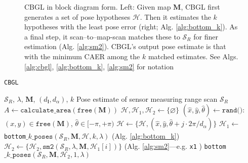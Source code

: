 \begin{figure}[H]%
  \subfloat{\label{fig:cbgl}     }
  \subfloat{\label{fig:bottom_k} }
  \caption{\small CBGL in block diagram form. Left: Given map $\bm{M}$, CBGL
           first generates a set of pose hypotheses $\mathcal{H}$. Then it
           estimates the $k$ hypotheses with the least pose error (right; Alg.
           \ref{alg:bottom_k}).
           As a final step, it scan--to--map-scan
           matches these to $\mathcal{S}_R$ for finer estimation
           (Alg. \ref{alg:sm2}).
           CBGL's output pose estimate is that with
           the minimum CAER among the $k$ matched estimates. See Algs.
           \ref{alg:cbgl}, \ref{alg:bottom_k}, \ref{alg:sm2} for notation
           }
  \label{fig:block_system}
\end{figure}


\begin{algorithm}[H]
  \caption{\texttt{CBGL}}
  \begin{spacing}{1.0}
  \begin{algorithmic}[1]
    \REQUIRE $\mathcal{S}_R$, $\lambda$, $\bm{M}$, $(d_{\bm{l}}, d_\alpha)$, $k$
    \ENSURE Pose estimate of sensor measuring range scan $\mathcal{S}_R$ %
    \STATE $A \leftarrow \texttt{calculate\_area}(\texttt{free}(\bm{M}))$
    \STATE $\mathcal{H}, \mathcal{H}_1, \mathcal{H}_2 \leftarrow \{\varnothing\}$
      \STATE \small $(\hat{x},\hat{y},\hat{\theta}) \leftarrow \texttt{rand()}$: $(x,y) \in \texttt{free}(\bm{M})$, $\hat{\theta} \in [-\pi,+\pi)$
        \STATE $\mathcal{H} \leftarrow \{\mathcal{H}, (\hat{x}, \hat{y}, \hat{\theta} + j \cdot 2\pi / d_{\alpha})\}$     \label{alg:cbgl:h}
      \ENDFOR
    \ENDFOR
    \STATE $\mathcal{H}_1 \leftarrow$ \texttt{bottom}$\_k\_\texttt{poses}(\mathcal{S}_R, \bm{M}, \mathcal{H}, k, \lambda)$ \hfill {\small (Alg. \ref{alg:bottom_k}}) \label{alg:cbgl:h1}
      \STATE \footnotesize $\mathcal{H}_2 \leftarrow \{\mathcal{H}_2, \texttt{sm2}(\mathcal{S}_R, \lambda, \bm{M}, \mathcal{H}_1[i])\}$ \hfill {(Alg. \ref{alg:sm2}---e.g. \texttt{x1} \cite{Filotheou2023a})}\label{alg:cbgl:h2}
    \ENDFOR
    \RETURN \texttt{bottom}$\_k\_\texttt{poses}(\mathcal{S}_R, \bm{M}, \mathcal{H}_2, 1, \lambda)$
  \end{algorithmic}
  \end{spacing}
  \label{alg:cbgl}
\end{algorithm}

